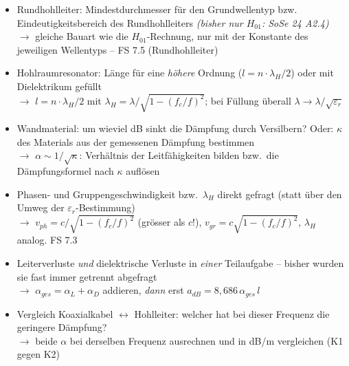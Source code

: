 \documentclass[a4paper,10pt]{article}
\begin{document}
\begin{tcolorbox}[colback=A2Farbe!4, colframe=A2Farbe!55, boxrule=0.5pt, arc=1mm, left=3mm, right=2mm, top=2mm, bottom=2mm, breakable, title={\sffamily\bfseries\small Was diesmal neu drankommen könnte \normalfont\itshape\footnotesize -- eigene Prognose (keine offizielle Ankündigung): Umkehrungen, Kombinationen und Transfers zwischen den Aufgabentypen}, coltitle=white, colbacktitle=A2Farbe!70]
\sffamily\small
\begin{itemize}\setlength{\itemsep}{2.2mm}\setlength{\leftmargini}{4mm}
\item Rundhohlleiter: Mindestdurchmesser für den Grundwellentyp bzw. Eindeutigkeitsbereich des Rundhohlleiters \textcolor{Grau}{\itshape(bisher nur $H_{01}$: SoSe 24 A2.4)}\\[0.6mm] {\footnotesize\color{A2Farbe}$\rightarrow$ gleiche Bauart wie die $H_{01}$-Rechnung, nur mit der Konstante des jeweiligen Wellentyps -- FS 7.5 (Rundhohlleiter)}
\item Hohlraumresonator: Länge für eine \emph{höhere} Ordnung ($l=n\cdot\lambda_H/2$) oder mit Dielektrikum gefüllt\\[0.6mm] {\footnotesize\color{A2Farbe}$\rightarrow$ $l=n\cdot\lambda_H/2$ mit $\lambda_H=\lambda/\sqrt{1-(f_c/f)^2}$; bei Füllung überall $\lambda\to\lambda/\sqrt{\varepsilon_r}$}
\item Wandmaterial: um wieviel dB sinkt die Dämpfung durch Versilbern? Oder: $\kappa$ des Materials aus der gemessenen Dämpfung bestimmen\\[0.6mm] {\footnotesize\color{A2Farbe}$\rightarrow$ $\alpha\sim1/\sqrt{\kappa}$: Verhältnis der Leitfähigkeiten bilden bzw.\ die Dämpfungsformel nach $\kappa$ auflösen}
\item Phasen- und Gruppengeschwindigkeit bzw.\ $\lambda_H$ direkt gefragt (statt über den Umweg der $\varepsilon_r$-Bestimmung)\\[0.6mm] {\footnotesize\color{A2Farbe}$\rightarrow$ $v_{ph}=c/\sqrt{1-(f_c/f)^2}$ (grösser als $c$!), $v_{gr}=c\sqrt{1-(f_c/f)^2}$, $\lambda_H$ analog. FS 7.3}
\item Leiterverluste \emph{und} dielektrische Verluste in \emph{einer} Teilaufgabe -- bisher wurden sie fast immer getrennt abgefragt\\[0.6mm] {\footnotesize\color{A2Farbe}$\rightarrow$ $\alpha_{ges}=\alpha_L+\alpha_D$ addieren, \emph{dann} erst $a_{dB}=8{,}686\,\alpha_{ges}\,l$}
\item Vergleich Koaxialkabel $\leftrightarrow$ Hohlleiter: welcher hat bei dieser Frequenz die geringere Dämpfung?\\[0.6mm] {\footnotesize\color{A2Farbe}$\rightarrow$ beide $\alpha$ bei derselben Frequenz ausrechnen und in dB/m vergleichen (K1 gegen K2)}
\end{itemize}\end{tcolorbox}
\end{document}
